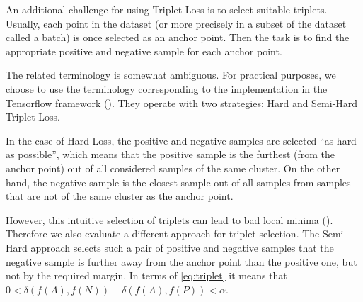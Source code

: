 An additional challenge for using Triplet Loss is to select suitable triplets. Usually, each point in the dataset (or more precisely in a subset of the dataset called a batch) is once selected as an anchor point. Then the task is to find the appropriate positive and negative sample for each anchor point.

The related terminology is somewhat ambiguous. For practical purposes, we choose to use the terminology corresponding to the implementation in the Tensorflow framework (\cite{tensorflow}). They operate with two strategies: Hard and Semi-Hard Triplet Loss.

In the case of Hard Loss, the positive and negative samples are selected ``as hard as possible'', which means that the positive sample is the furthest (from the anchor point) out of all considered samples of the same cluster. On the other hand, the negative sample is the closest sample out of all samples from samples that are not of the same cluster as the anchor point.

However, this intuitive selection of triplets can lead to bad local minima (\cite{tripletlossnn}). Therefore we also evaluate a different approach for triplet selection. The Semi-Hard approach selects such a pair of positive and negative samples that the negative sample is further away from the anchor point than the positive one, but not by the required margin. In terms of \autoref{eq:triplet} it means that $0 < \delta(f(A), f(N)) - \delta(f(A), f(P)) < \alpha$.